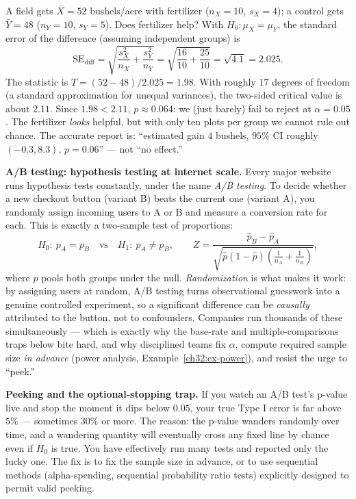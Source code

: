 \begin{example}
\label{ch32:ex-twosample}
A field gets $\bar X = 52$ bushels/acre with fertilizer ($n_X=10$, $s_X=4$); a control
gets $\bar Y = 48$ ($n_Y=10$, $s_Y=5$). Does fertilizer help? With $H_0\!:\mu_X=\mu_Y$,
the standard error of the difference (assuming independent groups) is
\[
  \mathrm{SE}_{\text{diff}} = \sqrt{\frac{s_X^2}{n_X}+\frac{s_Y^2}{n_Y}}
  = \sqrt{\frac{16}{10}+\frac{25}{10}} = \sqrt{4.1} = 2.025.
\]
The statistic is $T = (52-48)/2.025 = 1.98$. With roughly $17$ degrees of freedom (a
standard approximation for unequal variances), the two-sided critical value is about
$2.11$. Since $1.98 < 2.11$, $p \approx 0.064$: we (just barely) fail to reject at
$\alpha=0.05$. The fertilizer \emph{looks} helpful, but with only ten plots per group we
cannot rule out chance. The accurate report is: ``estimated gain $4$ bushels, $95\%$ CI
roughly $(-0.3, 8.3)$, $p=0.06$'' --- not ``no effect.''
\end{example}

\begin{applicationbox}
\textbf{A/B testing: hypothesis testing at internet scale.} Every major website runs
hypothesis tests constantly, under the name \emph{A/B testing}. To decide whether a new
checkout button (variant B) beats the current one (variant A), you randomly assign
incoming users to A or B and measure a conversion rate for each. This is exactly a
two-sample test of proportions:
\[
  H_0\!:\ p_A = p_B \quad\text{vs}\quad H_1\!:\ p_A \ne p_B,\qquad
  Z = \frac{\hat p_B - \hat p_A}{\sqrt{\hat p(1-\hat p)\left(\tfrac{1}{n_A}+\tfrac{1}{n_B}\right)}},
\]
where $\hat p$ pools both groups under the null. \emph{Randomization} is what makes it
work: by assigning users at random, A/B testing turns observational guesswork into
a genuine controlled experiment, so a significant difference can be \emph{causally}
attributed to the button, not to confounders. Companies run thousands of these
simultaneously --- which is exactly why the base-rate and multiple-comparisons traps
below bite hard, and why disciplined teams fix $\alpha$, compute required sample size
\emph{in advance} (power analysis, Example~\ref{ch32:ex-power}), and resist the urge to
``peek.''
\end{applicationbox}

\begin{trapbox}
\textbf{Peeking and the optional-stopping trap.} If you watch an A/B test's p-value live
and stop the moment it dips below $0.05$, your true Type I error is far above $5\%$ ---
sometimes $30\%$ or more. The reason: the p-value wanders randomly over time, and a
wandering quantity will eventually cross any fixed line by chance even if $H_0$ is true.
You have effectively run many tests and reported only the lucky one. The fix is to fix
the sample size in advance, or to use sequential methods (alpha-spending, sequential
probability ratio tests) explicitly designed to permit valid peeking.
\end{trapbox}

